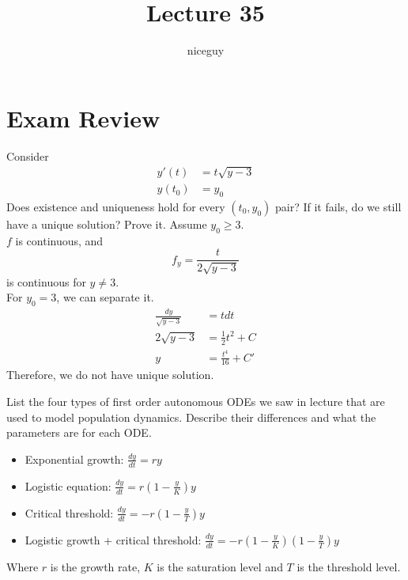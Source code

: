 \documentclass[12pt]{article}
\author{niceguy}
\title{Lecture 35}
\begin{document}
\maketitle

\section{Exam Review}

\begin{ex}
	Consider
	\begin{align*}
		y'(t) &= t\sqrt{y-3} \\
		y(t_0) &= y_0
	\end{align*}
	Does existence and uniqueness hold for every $(t_0,y_0)$ pair? If it fails, do we still have a unique solution? Prove it. Assume $y_0 \geq 3$. \\
	$f$ is continuous, and
	$$f_y = \frac{t}{2\sqrt{y-3}}$$
	is continuous for $y \neq 3$. \\
	For $y_0 = 3$, we can separate it.
	\begin{align*}
		\frac{dy}{\sqrt{y-3}} &= tdt \\
		2\sqrt{y-3} &= \frac{1}{2}t^2+C \\
		y &= \frac{t^4}{16} + C'
	\end{align*}
	Therefore, we do not have unique solution.
\end{ex}

\begin{ex}
	List the four types of first order autonomous ODEs we saw in lecture that are used to model population dynamics. Describe their differences and what the parameters are for each ODE. \\
	\begin{itemize}
		\item Exponential growth: $\frac{dy}{dt} = ry$
		\item Logistic equation: $\frac{dy}{dt} = r\left(1-\frac{y}{K}\right)y$
		\item Critical threshold: $\frac{dy}{dt} = -r\left(1-\frac{y}{T}\right)y$
		\item Logistic growth + critical threshold: $\frac{dy}{dt} = -r\left(1-\frac{y}{K}\right)\left(1-\frac{y}{T}\right)y$
	\end{itemize}
	Where $r$ is the growth rate, $K$ is the saturation level and $T$ is the threshold level.
\end{ex}
\end{document}
